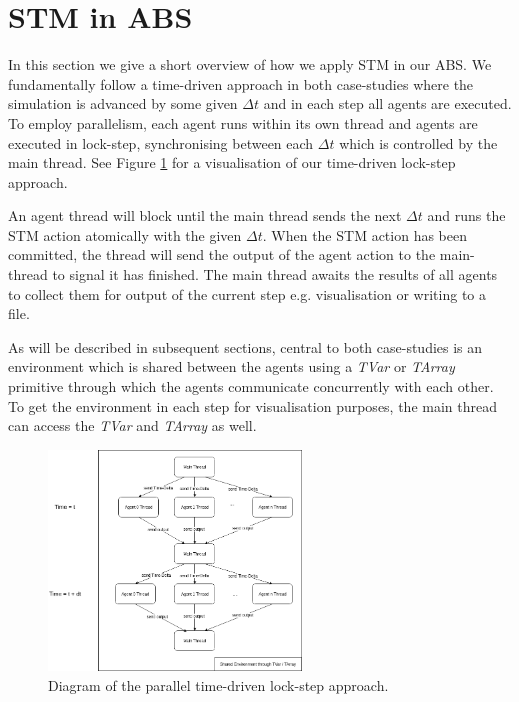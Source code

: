 \section{STM in ABS}
\label{sec:stm_abs}
In this section we give a short overview of how we apply STM in our ABS. We fundamentally follow a time-driven approach in both case-studies where the simulation is advanced by some given $\Delta t$ and in each step all agents are executed. To employ parallelism, each agent runs within its own thread and agents are executed in lock-step, synchronising between each $\Delta t$ which is controlled by the main thread. See Figure \ref{fig:stm_abs_structure} for a visualisation of our time-driven lock-step approach.

An agent thread will block until the main thread sends the next $\Delta t$ and runs the STM action atomically with the given $\Delta t$. When the STM action has been committed, the thread will send the output of the agent action to the main-thread to signal it has finished. The main thread awaits the results of all agents to collect them for output of the current step e.g. visualisation or writing to a file.

As will be described in subsequent sections, central to both case-studies is an environment which is shared between the agents using a \textit{TVar} or \textit{TArray} primitive through which the agents communicate concurrently with each other. To get the environment in each step for visualisation purposes, the main thread can access the \textit{TVar} and \textit{TArray} as well. 

\begin{figure}
	\centering
	\includegraphics[width=0.6\textwidth, angle=0]{./fig/dia/stm_abs.png}
	\caption{Diagram of the parallel time-driven lock-step approach.}
	\label{fig:stm_abs_structure}
\end{figure}